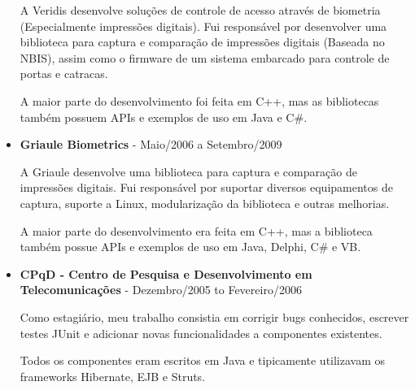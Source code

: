 \documentclass[a4paper,10pt]{article}
\begin{document}
\begin{itemize}
        A Veridis desenvolve soluções de controle de acesso através de biometria (Especialmente impressões digitais). Fui responsável por desenvolver uma biblioteca para captura e comparação de impressões digitais (Baseada no NBIS), assim como o firmware de um sistema embarcado para controle de portas e catracas.
        
        A maior parte do desenvolvimento foi feita em C++, mas as bibliotecas também possuem APIs e exemplos de uso em Java e C\#.

      \item
        \textbf{Griaule Biometrics} - Maio/2006 a Setembro/2009
        
        A Griaule desenvolve uma biblioteca para captura e comparação de impressões digitais. Fui responsável por suportar diversos equipamentos de captura, suporte a Linux, modularização da biblioteca e outras melhorias.
        
        A maior parte do desenvolvimento era feita em C++, mas a biblioteca também possue APIs e exemplos de uso em Java, Delphi, C\# e VB.

      \item
        \textbf{CPqD - Centro de Pesquisa e Desenvolvimento em Telecomunicações} - Dezembro/2005 to Fevereiro/2006

        Como estagiário, meu trabalho consistia em corrigir bugs conhecidos, escrever testes JUnit e adicionar novas funcionalidades a componentes existentes.

        Todos os componentes eram escritos em Java e tipicamente utilizavam os frameworks Hibernate, EJB e Struts.
    \end{itemize}
\end{document}
